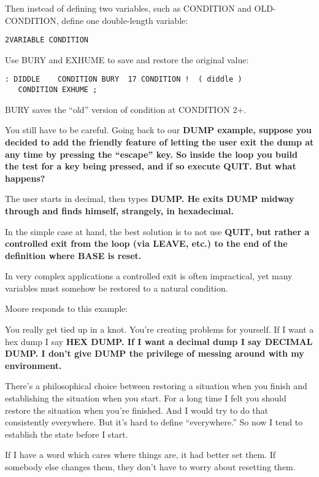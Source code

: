 Then instead of defining two variables, such as CONDITION and
OLD-CONDITION, define one double-length variable:

\begin{verbatim}
2VARIABLE CONDITION
\end{verbatim}

Use BURY and EXHUME to save and restore the original value:

\begin{verbatim}
: DIDDLE    CONDITION BURY  17 CONDITION !  ( diddle )
   CONDITION EXHUME ;
\end{verbatim}

BURY saves the ``old'' version of condition at CONDITION 2+.

You still have to be careful. Going back to our \bf{DUMP} example, suppose
you decided to add the friendly feature of letting the user exit the
dump at any time by pressing the ``escape'' key. So inside the loop you
build the test for a key being pressed, and if so execute \bf{QUIT}. But what
happens?

The user starts in decimal, then types \bf{DUMP}. He exits \bf{DUMP} midway
through and finds himself, strangely, in hexadecimal.

In the simple case at hand, the best solution is to not use \bf{QUIT}, but
rather a controlled exit from the loop (via \bf{LEAVE}, etc.) to the end of the
definition where \bf{BASE} is reset.

In very complex applications a controlled exit is often impractical,
yet many variables must somehow be restored to a natural condition.

Moore responds to this example:

You really get tied up in a knot. You're creating problems for yourself. If I
want a hex dump I say \bf{HEX DUMP}. If I want a decimal dump I say
\bf{DECIMAL DUMP}. I don't give \bf{DUMP} the privilege of messing around
with my environment.

There's a philosophical choice between restoring a situation when you
finish and establishing the situation when you start. For a long time I felt
you should restore the situation when you're finished. And I would try to
do that consistently everywhere. But it's hard to define ``everywhere.'' So
now I tend to establish the state before I start.

If I have a word which cares where things are, it had better set them. If
somebody else changes them, they don't have to worry about resetting
them.

